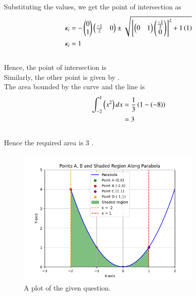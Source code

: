 \documentclass[journal]{IEEEtran}
\numberwithin{equation}{enumi}
\numberwithin{figure}{enumi}
\begin{document}
Substituting the values, we get the point of intersection as \\
\begin{align}
	\kappa_i &= -\begin{pmatrix}0 \\ 1\end{pmatrix}\begin{pmatrix}\frac{-1}{2} & 0\end{pmatrix} \pm \sqrt{{}\left[\begin{pmatrix}0 & 1\end{pmatrix}\begin{pmatrix} \frac{-1}{2} \\ 0\end{pmatrix} \right]^2 + 1\left(1\right)} \\
	\kappa_i &= 1 
\end{align}\\
Hence, the point of intersection is  \\
Similarly, the other point is given by  .\\
The area bounded by the curve and the line is \\
\begin{align}
	\int_{-2}^{1} \left(x^2\right) dx &= \frac{1}{3}\left( 1 - (-8) \right) \\
	&= 3 
\end{align}\\
Hence the required area is $3$ .
	
\begin{figure}[ht]
	\centering
	\includegraphics[width=0.8\textwidth]{figs/fig.png}
	\caption{A plot of the given question.}
\end{figure}
\end{document}

